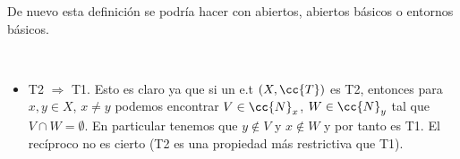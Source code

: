 \begin{definicion}
\begin{itemize}
        \begin{center}
        \end{center}

        De nuevo esta definición se podría hacer con abiertos, abiertos básicos o entornos básicos.
    \end{itemize}
    \endsquare
\end{definicion}

\begin{observacion}\
    \begin{itemize}
        \item T2 $\Rightarrow$ T1. Esto es claro ya que si un e.t $(X, \cc{T})$ es T2, entonces para $x,y\in X$, $x\neq y$ podemos encontrar $V \in \cc{N}_x$, $W\in \cc{N}_y$ tal que $V\cap W = \emptyset$. En particular tenemos que $y\notin V$ y $x\notin W$ y por tanto es T1. El recíproco no es cierto (T2 es una propiedad más restrictiva que T1).
    \end{itemize}
    \endsquare
\end{observacion}

